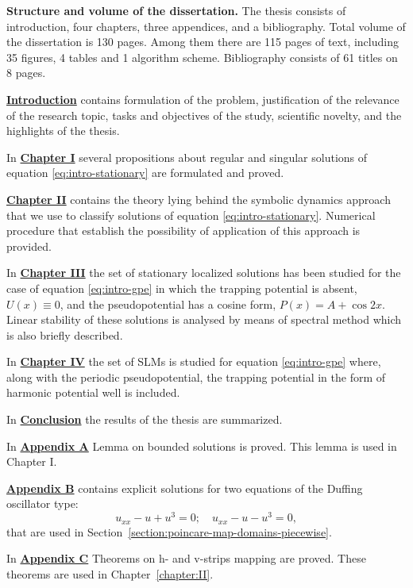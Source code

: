 \textbf{Structure and volume of the dissertation.}
The thesis consists of introduction, four chapters, three appendices, and a bibliography.
Total volume of the dissertation is 130 pages.
Among them there are 115 pages of text, including 35 figures, 4 tables and 1 algorithm scheme.
Bibliography consists of 61 titles on 8 pages.

\textbf{\hyperref[introduction]{Introduction}} contains formulation of the problem, justification of the relevance of the research topic, tasks and objectives of the study, scientific novelty, and the highlights of the thesis.

In \textbf{\hyperref[chapter:I]{Chapter I}} several propositions about regular and singular solutions of equation \eqref{eq:intro-stationary} are formulated and proved.

\textbf{\hyperref[chapter:II]{Chapter II}} contains the theory lying behind the symbolic dynamics approach that we use to classify solutions of equation \eqref{eq:intro-stationary}.
Numerical procedure that establish the possibility of application of this approach is provided.

In \textbf{\hyperref[chapter:III]{Chapter III}} the set of stationary localized solutions has been studied for the case of equation \eqref{eq:intro-gpe} in which the trapping potential is absent, $U(x) \equiv 0$, and the pseudopotential has a cosine form, $P(x) = A + \cos 2x$.
Linear stability of these solutions is analysed by means of spectral method which is also briefly described.

In \textbf{\hyperref[chapter:IV]{Chapter IV}} the set of SLMs is studied for equation \eqref{eq:intro-gpe} where, along with the periodic pseudopotential, the trapping potential in the form of harmonic potential well is included.

In \textbf{\hyperref[conclusion]{Conclusion}} the results of the thesis are summarized.

In \textbf{\hyperref[appendix:lemma-on-bounded-solutions]{Appendix A}} Lemma on bounded solutions is proved.
This lemma is used in Chapter I.

\textbf{\hyperref[appendix:solutions-of-duffing-equations]{Appendix B}} contains explicit solutions for two equations of the Duffing oscillator type: 
\begin{equation}
	u_{xx} - u + u^3 = 0; \quad u_{xx} - u - u^3 = 0,
\end{equation}
that are used in Section~\ref{section:poincare-map-domains-piecewise}.

In \textbf{\hyperref[appendix:strips-mapping-theorems]{Appendix C}} Theorems on h- and v-strips mapping are proved.
These theorems are used in Chapter~\ref{chapter:II}.
